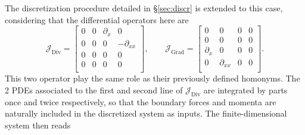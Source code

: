 \documentclass{svjour3}                     %
\newcommand{\secref}[1]{\S\ref{#1}}
\DeclareMathOperator*{\Grad}{Grad}
\DeclareMathOperator*{\Div}{Div}
\begin{document}
The discretization procedure detailed in \secref{sec:discr} is extended to this case, considering that the differential operators here are 
\[
\bm{\mathcal{J}}_{\Div} = \begin{bmatrix}
0 & 0 & \partial_x & 0 \\
0 & 0 & 0 & -\partial_{xx} \\
0 & 0 & 0 & 0 \\
0 & 0 & 0 & 0 \\
\end{bmatrix}, \qquad 
\bm{\mathcal{J}}_{\Grad} = \begin{bmatrix}
0 & 0 & 0 & 0 \\
0 & 0 & 0 & 0 \\
\partial_x & 0 & 0 & 0 \\
0 & \partial_{xx} & 0 & 0 \\
\end{bmatrix}.
\]
This two operator play the same role as their previously defined homonyms. The 2 PDEs associated to the first and second line of $\bm{\mathcal{J}}_{\Div}$ are integrated by parts once and twice respectively, so that the boundary forces and momenta are naturally included in the discretized system as inputs. The finite-dimensional system then reads
\end{document}
